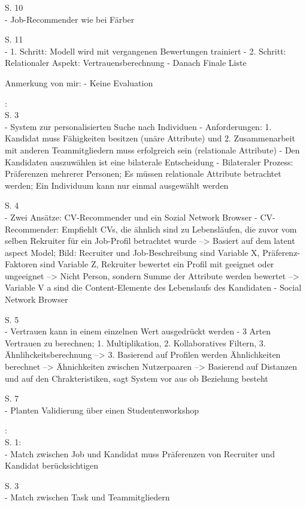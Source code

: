 S. 10\\
- Job-Recommender wie bei Färber

S. 11\\
- 1. Schritt: Modell wird mit vergangenen Bewertungen trainiert
- 2. Schritt: Relationaler Aspekt: Vertrauensberechnung
- Danach Finale Liste

Anmerkung von mir:
- Keine Evaluation

\textcite{keim:2005}:\\
S. 3\\
- System zur personalisierten Suche nach Individuen
- Anforderungen: 1. Kandidat muss Fähigkeiten besitzen (unäre Attribute) und 2. Zusammenarbeit mit anderen Teammitgliedern muss erfolgreich sein (relationale Attribute)
- Den Kandidaten auszuwählen ist eine bilaterale Entscheidung
- Bilateraler Prozess: Präferenzen mehrerer Personen; Es müssen relationale Attribute betrachtet werden; Ein Individuum kann nur einmal ausgewählt werden

S. 4\\
- Zwei Ansätze: CV-Recommender und ein Sozial Network Browser
- CV-Recommender: Empfiehlt CVs, die ähnlich sind zu Lebensläufen, die zuvor vom selben Rekruiter für ein Job-Profil betrachtet wurde --> Basiert auf dem latent aspect Model; Bild: Recruiter und Job-Beschreibung sind Variable X, Präferenz-Faktoren sind Variable Z, Rekruiter bewertet ein Profil mit geeignet oder ungeeignet --> Nicht Person, sondern Summe der Attribute werden bewertet --> Variable V a sind die Content-Elemente des Lebenslaufs des Kandidaten
- Social Network Browser

S. 5\\
- Vertrauen kann in einem einzelnen Wert ausgedrückt werden
- 3 Arten Vertrauen zu berechnen; 1. Multiplikation, 2. Kollaboratives Filtern, 3. Ähnlihckeitsberechnung --> 3. Basierend auf Profilen werden Ähnlichkeiten berechnet --> Ähnichkeiten zwischen Nutzerpaaren --> Basierend auf Distanzen und auf den Chrakteristiken, sagt System vor aus ob Beziehung besteht

S. 7\\
- Planten Validierung über einen Studentenworkshop

\textcite{malinowski:2006}:\\
S. 1:\\
- Match zwischen Job und Kandidat muss Präferenzen von Recruiter und Kandidat berücksichtigen

S. 3\\
- Match zwischen Task und Teammitgliedern

